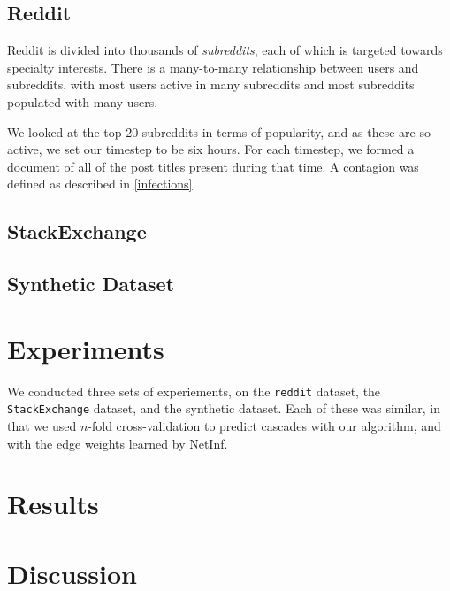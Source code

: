 \documentclass{article} %
\begin{document}
\subsection{Reddit}
Reddit is divided into thousands of \textit{subreddits}, each of which is targeted towards specialty interests. There is a many-to-many relationship between users and subreddits, with most users active in many subreddits and most subreddits populated with many users.

We looked at the top 20 subreddits in terms of popularity, and as these are so active, we set our timestep to be six hours. For each timestep, we formed a document of all of the post titles present during that time. A contagion was defined as described in \ref{infections}.


\subsection{StackExchange}

\subsection{Synthetic Dataset}




\section{Experiments}
\label{experiments}

We conducted three sets of experiements, on the \texttt{reddit} dataset, the \texttt{StackExchange} dataset, and the synthetic dataset. Each of these was similar, in that we used $n$-fold cross-validation to predict cascades with our algorithm, and with the edge weights learned by NetInf.

\section{Results}
\label{results}



\section{Discussion}
\label{discussion}


{}
\label{refs}

\end{document}
